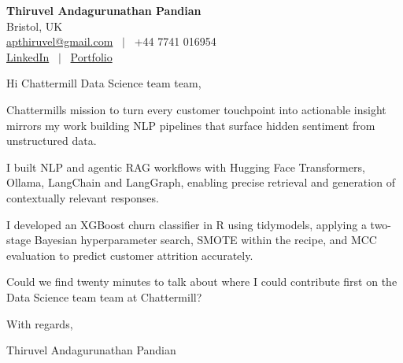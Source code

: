 \documentclass[11pt,a4paper]{article}
\begin{document}
\raggedright
\pagestyle{empty}

\begin{center}
    {\LARGE \color{linkblue} \textbf{Thiruvel Andagurunathan Pandian}}\\[0.2cm]
    Bristol, UK \\
    \href{mailto:apthiruvel@gmail.com}{apthiruvel@gmail.com} \ $|$ \ +44 7741 016954 \\
\href{https://www.linkedin.com/in/thiruvel-a-p/}{LinkedIn} \ $|$ \ \href{https://thiruvel-ap.github.io/PersonalPortfolio/}{Portfolio}
\end{center}

\vspace{0.4cm}

\noindent
Hi Chattermill Data Science team team,

Chattermill\textquotesingle{}s mission to turn every customer touchpoint into actionable insight mirrors my work building NLP pipelines that surface hidden sentiment from unstructured data.

I built NLP and agentic RAG workflows with Hugging Face Transformers, Ollama, LangChain and LangGraph, enabling precise retrieval and generation of contextually relevant responses.

I developed an XGBoost churn classifier in R using tidymodels, applying a two-stage Bayesian hyperparameter search, SMOTE within the recipe, and MCC evaluation to predict customer attrition accurately.

Could we find twenty minutes to talk about where I could contribute first on the Data Science team team at Chattermill?

\vspace{0.5cm}

With regards,

Thiruvel Andagurunathan Pandian
\end{document}
